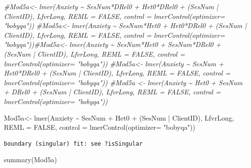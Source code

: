 \documentclass[
  english,
]{book}
\newenvironment{Shaded}{\begin{snugshade}}{\end{snugshade}}
\newcommand{\AttributeTok}[1]{\textcolor[rgb]{0.77,0.63,0.00}{#1}}
\newcommand{\CommentTok}[1]{\textcolor[rgb]{0.56,0.35,0.01}{\textit{#1}}}
\newcommand{\ConstantTok}[1]{\textcolor[rgb]{0.00,0.00,0.00}{#1}}
\newcommand{\FunctionTok}[1]{\textcolor[rgb]{0.00,0.00,0.00}{#1}}
\newcommand{\NormalTok}[1]{#1}
\newcommand{\OtherTok}[1]{\textcolor[rgb]{0.56,0.35,0.01}{#1}}
\newcommand{\SpecialCharTok}[1]{\textcolor[rgb]{0.00,0.00,0.00}{#1}}
\newcommand{\StringTok}[1]{\textcolor[rgb]{0.31,0.60,0.02}{#1}}
\begin{document}
\begin{Shaded}
\begin{Highlighting}[]
\CommentTok{\#Mod5a\textless{}{-} lmer(Anxiety \textasciitilde{}  SesNum*DRel0 + Het0*DRel0 + (SesNum | ClientID), LfvrLong, REML = FALSE, control = lmerControl(optimizer= "bobyqa"))}
\CommentTok{\#Mod5a\textless{}{-} lmer(Anxiety \textasciitilde{} SesNum*Het0 +  Het0*DRel0 + (SesNum | ClientID), LfvrLong, REML = FALSE, control = lmerControl(optimizer= "bobyqa"))\#Mod5a\textless{}{-} lmer(Anxiety \textasciitilde{} SesNum*Het0 + SesNum*DRel0 + (SesNum | ClientID), LfvrLong, REML = FALSE, control = lmerControl(optimizer= "bobyqa"))}
\CommentTok{\#Mod5a\textless{}{-} lmer(Anxiety \textasciitilde{} SesNum + Het0*DRel0 + (SesNum | ClientID), LfvrLong, REML = FALSE, control = lmerControl(optimizer= "bobyqa"))}
\CommentTok{\#Mod5a \textless{}{-} lmer(Anxiety \textasciitilde{} Het0 + SesNum + DRel0 + (SesNum | ClientID), LfvrLong, REML = FALSE, control = lmerControl(optimizer= "bobyqa"))}

\NormalTok{Mod5a}\OtherTok{\textless{}{-}} \FunctionTok{lmer}\NormalTok{(Anxiety }\SpecialCharTok{\textasciitilde{}}\NormalTok{ SesNum }\SpecialCharTok{+}\NormalTok{ Het0 }\SpecialCharTok{+}\NormalTok{ (SesNum }\SpecialCharTok{|}\NormalTok{ ClientID), LfvrLong, }\AttributeTok{REML =} \ConstantTok{FALSE}\NormalTok{, }\AttributeTok{control =} \FunctionTok{lmerControl}\NormalTok{(}\AttributeTok{optimizer=} \StringTok{"bobyqa"}\NormalTok{))}
\end{Highlighting}
\end{Shaded}

\begin{verbatim}
boundary (singular) fit: see ?isSingular
\end{verbatim}

\begin{Shaded}
\begin{Highlighting}[]
\FunctionTok{summary}\NormalTok{(Mod5a)}
\end{Highlighting}
\end{Shaded}
\end{document}
